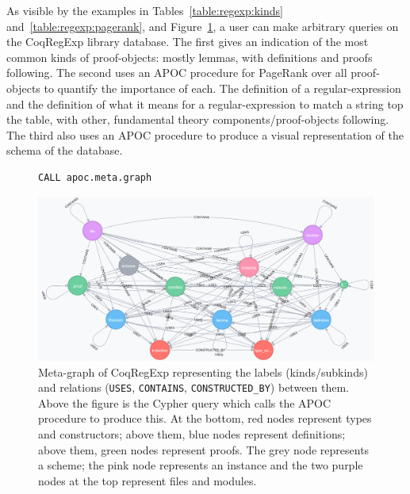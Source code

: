 As visible by the examples in Tables~\ref{table:regexp:kinds}
and~\ref{table:regexp:pagerank}, and Figure~\ref{fig:regexp:meta}, a user can
make arbitrary queries on the CoqRegExp library database. The first gives an
indication of the most common kinds of proof-objects: mostly lemmas, with
definitions and proofs following.  The second uses an APOC procedure for
PageRank over all proof-objects to quantify the importance of each. The
definition of a regular-expression and the definition of what it means for a
regular-expression to match a string top the table, with other, fundamental
theory components/proof-objects following. The third also uses an APOC
procedure to produce a visual representation of the schema of the database.

\begin{table}[tp]
  
\end{table}

\begin{table}[tp]
  
\end{table}

\begin{figure}[tp]
\begin{verbatim}
CALL apoc.meta.graph
\end{verbatim}
\centering
\includegraphics[width=\textwidth]{img/regexp/meta.png}
\caption{Meta-graph of CoqRegExp representing the labels (kinds/subkinds) and
  relations (\texttt{USES}, \texttt{CONTAINS}, \texttt{CONSTRUCTED\_BY})
  between them. Above the figure is the Cypher query which calls the APOC
  procedure to produce this. At the bottom, red nodes represent types and
  constructors; above them, blue nodes represent definitions; above them, green
  nodes represent proofs. The grey node represents a scheme; the pink node
  represents an instance and the two purple nodes at the top represent files
  and modules.}\label{fig:regexp:meta}
\end{figure}

